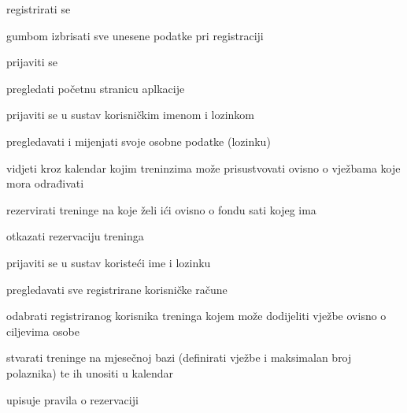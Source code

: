 			
			\begin{packed_enum}


				\item  {}
				
				\begin{packed_enum}
					
					\item registrirati se
					\item gumbom izbrisati sve unesene podatke pri registraciji
					\item prijaviti se
					\item pregledati početnu stranicu aplkacije
										
				\end{packed_enum}
			
				\item  {}
				
				\begin{packed_enum}
					
					\item prijaviti se u sustav korisničkim imenom i lozinkom
					\item pregledavati i mijenjati svoje osobne podatke (lozinku)
					\item vidjeti kroz kalendar kojim treninzima može prisustvovati ovisno o vježbama koje mora odrađivati
					\item rezervirati treninge na koje želi ići ovisno o fondu sati kojeg ima
					\item otkazati rezervaciju treninga
					
				\end{packed_enum}
			
			    \item  {}
			    
			    \begin{packed_enum}
			    	
			    	\item prijaviti se u sustav koristeći ime i lozinku
			    	\item pregledavati sve registrirane korisničke račune
			    	\item odabrati registriranog korisnika treninga kojem može dodijeliti vježbe ovisno o ciljevima osobe
			    	\item stvarati treninge na mjesečnoj bazi (definirati vježbe i maksimalan broj polaznika) te ih unositi u kalendar
 			    	\item upisuje pravila o rezervaciji
			    	

\end{packed_enum}
\end{packed_enum}
